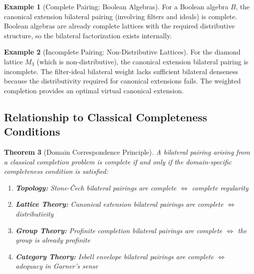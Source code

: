 \documentclass[11pt]{article}
\theoremstyle{plain}
\newtheorem{theorem}{Theorem}[section]
\theoremstyle{definition}
\newtheorem{example}[theorem]{Example}
\theoremstyle{remark}
\begin{document}
\begin{example}[Complete Pairing: Boolean Algebras]
For a Boolean algebra $B$, the canonical extension bilateral pairing (involving filters and ideals) is complete. Boolean algebras are already complete lattices with the required distributive structure, so the bilateral factorization exists internally.
\end{example}

\begin{example}[Incomplete Pairing: Non-Distributive Lattices]  
For the diamond lattice $M_3$ (which is non-distributive), the canonical extension bilateral pairing is incomplete. The filter-ideal bilateral weight lacks sufficient bilateral denseness because the distributivity required for canonical extensions fails. The weighted completion provides an optimal virtual canonical extension.
\end{example}

\subsection{Relationship to Classical Completeness Conditions}

\begin{theorem}[Domain Correspondence Principle]\label{thm:domain-correspondence}
A bilateral pairing arising from a classical completion problem is complete if and only if the domain-specific completeness condition is satisfied:

\begin{enumerate}
\item \textbf{Topology:} Stone-\v{C}ech bilateral pairings are complete $\Leftrightarrow$ complete regularity
\item \textbf{Lattice Theory:} Canonical extension bilateral pairings are complete $\Leftrightarrow$ distributivity  
\item \textbf{Group Theory:} Profinite completion bilateral pairings are complete $\Leftrightarrow$ the group is already profinite
\item \textbf{Category Theory:} Isbell envelope bilateral pairings are complete $\Leftrightarrow$ adequacy in Garner's sense
\end{enumerate}
\end{theorem}
\end{document}
